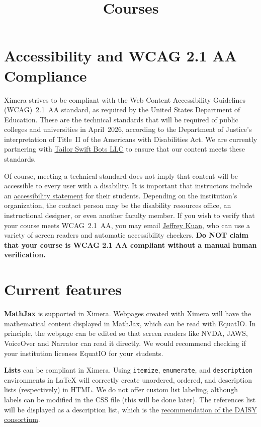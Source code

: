 \documentclass{ximera}
\title{Courses}
\begin{document}
\begin{abstract}
\end{abstract}
\maketitle


\section*{Accessibility and WCAG 2.1 AA Compliance}

Ximera strives to be compliant with the Web Content Accessibility Guidelines (WCAG)~2.1~AA standard, as required by the United States Department of Education. These are the technical standards that will be required of public colleges and universities in April~2026, according to the Department of Justice’s interpretation of Title~II of the Americans with Disabilities Act. We are currently partnering with \href{https://tailorswiftbot.com/}{Tailor Swift Bots LLC} to ensure that our content meets these standards.

Of course, meeting a technical standard does not imply that content will be accessible to every user with a disability. It is important that instructors include an \href{https://www.w3.org/WAI/planning/statements/}{accessibility statement} for their students. Depending on the institution’s organization, the contact person may be the disability resources office, an instructional designer, or even another faculty member. If you wish to verify that your course meets WCAG~2.1~AA, you may email \href{mailto:kuan.44@osu.edu}{Jeffrey Kuan}, who can use a variety of screen readers and automatic accessibility checkers. \textbf{Do NOT claim that your course is WCAG 2.1 AA compliant without a manual human verification.}

\section*{Current features}

\textbf{MathJax} is supported in Ximera.  
Webpages created with Ximera will have the mathematical content displayed in MathJax, which can be read with EquatIO. In principle, the webpage can be edited so that screen readers like NVDA, JAWS, VoiceOver and Narrator can read it directly. We would recommend checking if your institution licenses EquatIO for your students.

\medskip
\textbf{Lists} can be compliant in Ximera.  
Using \verb|itemize|, \verb|enumerate|, and \verb|description| environments in \LaTeX{} will correctly create unordered, ordered, and description lists (respectively) in HTML. We do not offer custom list labeling, although labels can be modified in the CSS file (this will be done later). The references list will be displayed as a description list, which is the \href{http://kb.daisy.org/publishing/docs/html/bibliographies.html}{recommendation of the DAISY consortium}.
\end{document}
